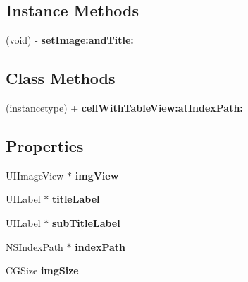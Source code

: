 \subsection*{Instance Methods}
\begin{DoxyCompactItemize}
\item 
\mbox{\label{interface_f_n_img_title_cell_a3eef486b88aa9cf16d3e4e2e16567839}} 
(void) -\/ {\bfseries set\+Image\+:and\+Title\+:}
\end{DoxyCompactItemize}
\subsection*{Class Methods}
\begin{DoxyCompactItemize}
\item 
\mbox{\label{interface_f_n_img_title_cell_aededa8788a8421f36532064967131046}} 
(instancetype) + {\bfseries cell\+With\+Table\+View\+:at\+Index\+Path\+:}
\end{DoxyCompactItemize}
\subsection*{Properties}
\begin{DoxyCompactItemize}
\item 
\mbox{\label{interface_f_n_img_title_cell_afc9b3a1b6a3d7d7c81e3d64d12a3d627}} 
U\+I\+Image\+View $\ast$ {\bfseries img\+View}
\item 
\mbox{\label{interface_f_n_img_title_cell_ad8e330c700aa8d33532b3a3c4c11e323}} 
U\+I\+Label $\ast$ {\bfseries title\+Label}
\item 
\mbox{\label{interface_f_n_img_title_cell_acbcbee4c5b47e2c1969844b193d4a460}} 
U\+I\+Label $\ast$ {\bfseries sub\+Title\+Label}
\item 
\mbox{\label{interface_f_n_img_title_cell_a8a5d90b07c851df81c4fb4aa9e7b3dad}} 
N\+S\+Index\+Path $\ast$ {\bfseries index\+Path}
\item 
\mbox{\label{interface_f_n_img_title_cell_aca4a238329532dc362411951fb6704ce}} 
C\+G\+Size {\bfseries img\+Size}
\end{DoxyCompactItemize}


